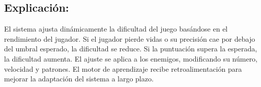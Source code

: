\subsection*{Explicación:}
El sistema ajusta dinámicamente la dificultad del juego basándose en el rendimiento del jugador. Si el jugador pierde vidas o su precisión cae por debajo del umbral esperado, la dificultad se reduce. Si la puntuación supera la esperada, la dificultad aumenta. El ajuste se aplica a los enemigos, modificando su número, velocidad y patrones. El motor de aprendizaje recibe retroalimentación para mejorar la adaptación del sistema a largo plazo.
